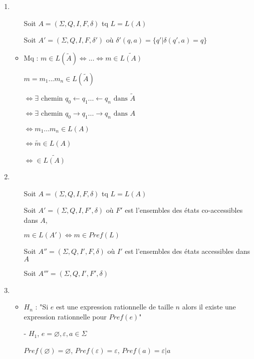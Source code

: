 \documentclass{article}
\newcommand{\image}[3]{ %
    \begin{minipage}[t]{\linewidth}
        #1
              \adjustbox{valign=t}{%
                \texttt{[image: \#3]}%
              }
    \end{minipage}}
\begin{document}
\begin{enumerate}
    \item \begin{itemize}
        \item[] Soit $A = (\Sigma, Q, I, F, \delta)$ tq $L = L(A)$
        \item[] Soit $A' = (\Sigma, Q, I, F, \delta')$ où $\delta'(q, a) = \{ q' |  \delta(q', a) = q \}$
        \item[] \image{}{0.2}{II-1/II-1.pdf}
        \item Mq : $m \in L(\tilde A) \Leftrightarrow ... \Leftrightarrow m \in \widetilde{L(A)}$
        \item[] $m = m_1...m_n \in L(\tilde A)$
        \item[] $\Leftrightarrow \exists \text{ chemin } q_0 \leftarrow q_1 ... \leftarrow q_n \text{ dans } \tilde A$
        \item[] $\Leftrightarrow \exists \text{ chemin } q_0 \rightarrow q_1 ... \rightarrow q_n \text{ dans } A$
        \item[] $\Leftrightarrow m_1...m_n \in L(A)$
        \item[] $\Leftrightarrow \tilde m \in L(A)$
        \item[] $\Leftrightarrow \in \widetilde{L(A)}$
    \end{itemize}
    \item \begin{itemize}
        \item[] Soit $A = (\Sigma, Q, I, F, \delta)$ tq $L = L(A)$
        \item[] Soit $A' = (\Sigma, Q, I, F', \delta)$ où $F'$ est l'ensembles des états co-accessibles dans $A$,
        \item[] $m \in L(A') \Leftrightarrow m \in Pref(L)$
        \item[] Soit $A'' = (\Sigma, Q, I', F, \delta)$ où $I'$ est l'ensembles des états accessibles dans $A$
        \item[] Soit $A''' = (\Sigma, Q, I', F', \delta)$
    \end{itemize}
    \item \begin{itemize}
        \item $H_n$ : "Si $e$ est une expression rationnelle de taille $n$ alors il existe une expression rationnelle pour $Pref(e)$"
        \item[-] $H_1$, $e = \varnothing, \varepsilon, a \in \Sigma$
        \item[] $Pref(\varnothing) = \varnothing$, $Pref(\varepsilon) = \varepsilon$, $Pref(a) = \varepsilon|a$

\end{itemize}
\end{enumerate}
\end{document}
